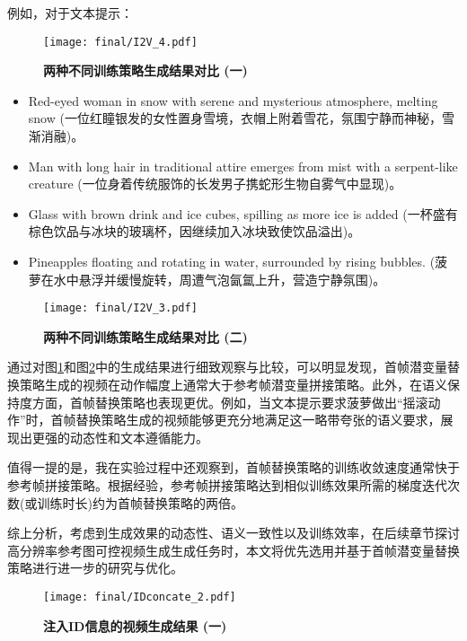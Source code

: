 例如，对于文本提示：
\begin{figure}[htbp]
    \centering
    \texttt{[image: final/I2V\_4.pdf]}
    \caption{\textbf{两种不同训练策略生成结果对比 (一)}}
    \label{I2V_4}
    \end{figure}
\begin{itemize}
\item Red-eyed woman in snow with serene and mysterious atmosphere, melting snow (一位红瞳银发的女性置身雪境，衣帽上附着雪花，氛围宁静而神秘，雪渐消融)。
\item Man with long hair in traditional attire emerges from mist with a serpent-like creature (一位身着传统服饰的长发男子携蛇形生物自雾气中显现)。
\item Glass with brown drink and ice cubes, spilling as more ice is added (一杯盛有棕色饮品与冰块的玻璃杯，因继续加入冰块致使饮品溢出)。
\item Pineapples floating and rotating in water, surrounded by rising bubbles. (菠萝在水中悬浮并缓慢旋转，周遭气泡氤氲上升，营造宁静氛围)。
\end{itemize}


\begin{figure}[htbp]
    \centering
    \texttt{[image: final/I2V\_3.pdf]}
    \caption{\textbf{两种不同训练策略生成结果对比 (二)}}
    \label{I2V_3}
\end{figure}

通过对图\ref{I2V_4}和图\ref{I2V_3}中的生成结果进行细致观察与比较，可以明显发现，首帧潜变量替换策略生成的视频在动作幅度上通常大于参考帧潜变量拼接策略。此外，在语义保持度方面，首帧替换策略也表现更优。例如，当文本提示要求菠萝做出“摇滚动作”时，首帧替换策略生成的视频能够更充分地满足这一略带夸张的语义要求，展现出更强的动态性和文本遵循能力。

值得一提的是，我在实验过程中还观察到，首帧替换策略的训练收敛速度通常快于参考帧拼接策略。根据经验，参考帧拼接策略达到相似训练效果所需的梯度迭代次数(或训练时长)约为首帧替换策略的两倍。

综上分析，考虑到生成效果的动态性、语义一致性以及训练效率，在后续章节探讨高分辨率参考图可控视频生成生成任务时，本文将优先选用并基于首帧潜变量替换策略进行进一步的研究与优化。

\begin{figure}[htbp]
    \centering
    \texttt{[image: final/IDconcate\_2.pdf]}
    \caption{\textbf{注入ID信息的视频生成结果 (一)}}
    \label{IDconcate_2}
\end{figure}


